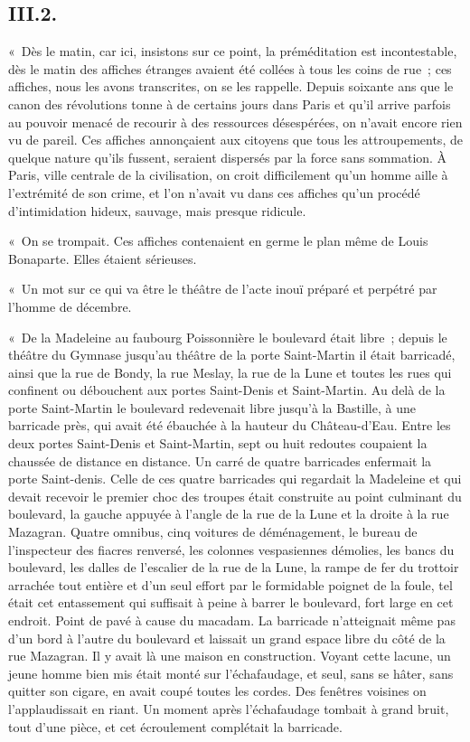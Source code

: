 \documentclass[french,twoside]{book} %
\begin{document}
\subsection[{III.2.}]{III.2.}
\noindent « Dès le matin, car ici, insistons sur ce point, la préméditation est incontestable, dès le matin des affiches étranges avaient été collées à tous les coins de rue ; ces affiches, nous les avons transcrites, on se les rappelle. Depuis soixante ans que le canon des révolutions tonne à de certains jours dans Paris et qu’il arrive parfois au pouvoir menacé de recourir à des ressources désespérées, on n’avait encore rien vu de pareil. Ces affiches annonçaient aux citoyens que tous les attroupements, de quelque nature qu’ils fussent, seraient dispersés par la force sans sommation. À Paris, ville centrale de la civilisation, on croit difficilement qu’un homme aille à l’extrémité de son crime, et l’on n’avait vu dans ces affiches qu’un procédé d’intimidation hideux, sauvage, mais presque ridicule.\par
« On se trompait. Ces affiches contenaient en germe le plan même de Louis Bonaparte. Elles étaient sérieuses.\par
« Un mot sur ce qui va être le théâtre de l’acte inouï préparé et perpétré par l’homme de décembre.\par
« De la Madeleine au faubourg Poissonnière le boulevard était libre ; depuis le théâtre du Gymnase jusqu’au théâtre de la porte Saint-Martin il était barricadé, ainsi que la rue de Bondy, la rue Meslay, la rue de la Lune et toutes les rues qui confinent ou débouchent aux portes Saint-Denis et Saint-Martin. Au delà de la porte Saint-Martin le boulevard redevenait libre jusqu’à la Bastille, à une barricade près, qui avait été ébauchée à la hauteur du Château-d’Eau. Entre les deux portes Saint-Denis et Saint-Martin, sept ou huit redoutes coupaient la chaussée de distance en distance. Un carré de quatre barricades enfermait la porte Saint-denis. Celle de ces quatre barricades qui regardait la Madeleine et qui devait recevoir le premier choc des troupes était construite au point culminant du boulevard, la gauche appuyée à l’angle de la rue de la Lune et la droite à la rue Mazagran. Quatre omnibus, cinq voitures de déménagement, le bureau de l’inspecteur des fiacres renversé, les colonnes vespasiennes démolies, les bancs du boulevard, les dalles de l’escalier de la rue de la Lune, la rampe de fer du trottoir arrachée tout entière et d’un seul effort par le formidable poignet de la foule, tel était cet entassement qui suffisait à peine à barrer le boulevard, fort large en cet endroit. Point de pavé à cause du macadam. La barricade n’atteignait même pas d’un bord à l’autre du boulevard et laissait un grand espace libre du côté de la rue Mazagran. Il y avait là une maison en construction. Voyant cette lacune, un jeune homme bien mis était monté sur l’échafaudage, et seul, sans se hâter, sans quitter son cigare, en avait coupé toutes les cordes. Des fenêtres voisines on l’applaudissait en riant. Un moment après l’échafaudage tombait à grand bruit, tout d’une pièce, et cet écroulement complétait la barricade.\par
\end{document}
